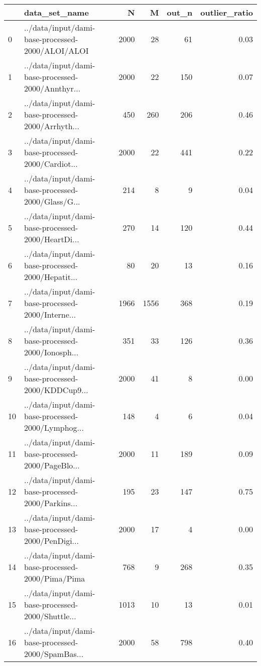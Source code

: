 \begin{tabular}{llrrrr}
\toprule
{} &                                      data\_set\_name &     N &     M &  out\_n &  outlier\_ratio \\
\midrule
0  &   ../data/input/dami-base-processed-2000/ALOI/ALOI &  2000 &    28 &     61 &           0.03 \\
1  &  ../data/input/dami-base-processed-2000/Annthyr... &  2000 &    22 &    150 &           0.07 \\
2  &  ../data/input/dami-base-processed-2000/Arrhyth... &   450 &   260 &    206 &           0.46 \\
3  &  ../data/input/dami-base-processed-2000/Cardiot... &  2000 &    22 &    441 &           0.22 \\
4  &  ../data/input/dami-base-processed-2000/Glass/G... &   214 &     8 &      9 &           0.04 \\
5  &  ../data/input/dami-base-processed-2000/HeartDi... &   270 &    14 &    120 &           0.44 \\
6  &  ../data/input/dami-base-processed-2000/Hepatit... &    80 &    20 &     13 &           0.16 \\
7  &  ../data/input/dami-base-processed-2000/Interne... &  1966 &  1556 &    368 &           0.19 \\
8  &  ../data/input/dami-base-processed-2000/Ionosph... &   351 &    33 &    126 &           0.36 \\
9  &  ../data/input/dami-base-processed-2000/KDDCup9... &  2000 &    41 &      8 &           0.00 \\
10 &  ../data/input/dami-base-processed-2000/Lymphog... &   148 &     4 &      6 &           0.04 \\
11 &  ../data/input/dami-base-processed-2000/PageBlo... &  2000 &    11 &    189 &           0.09 \\
12 &  ../data/input/dami-base-processed-2000/Parkins... &   195 &    23 &    147 &           0.75 \\
13 &  ../data/input/dami-base-processed-2000/PenDigi... &  2000 &    17 &      4 &           0.00 \\
14 &   ../data/input/dami-base-processed-2000/Pima/Pima &   768 &     9 &    268 &           0.35 \\
15 &  ../data/input/dami-base-processed-2000/Shuttle... &  1013 &    10 &     13 &           0.01 \\
16 &  ../data/input/dami-base-processed-2000/SpamBas... &  2000 &    58 &    798 &           0.40 \\

\end{tabular}
